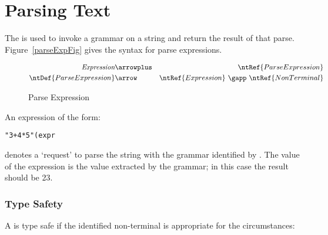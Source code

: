 \section{Parsing Text}
\label{parsingText}
The \q{\gapp}  is used to invoke a grammar on a string and return the result of that parse. Figure~\vref{parseExpFig} gives the syntax for parse expressions.

\begin{figure}[htbp]
\begin{eqnarray*}
\emph{Expression}&\arrowplus&\ntRef{ParseExpression}\\
\ntDef{ParseExpression}&\arrow&\ntRef{Expression}\ \gapp\ \ntRef{NonTerminal}
\end{eqnarray*}
\caption{Parse Expression}
\label{parseExpFig}
\end{figure}

An expression of the form:
\begin{alltt}
"3+4*5"(expr
\end{alltt}
denotes a `request' to parse the string  with the grammar identified by . The value of the expression is the value extracted by the grammar; in this case the result should be 23.

\subsubsection{Type Safety}
A  is type safe if the identified non-terminal is appropriate for the circumstances:
\begin{prooftree}
\end{prooftree}


